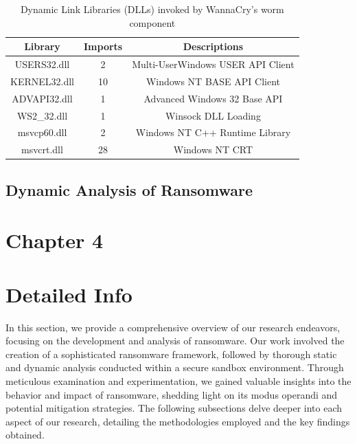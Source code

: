 \documentclass[12pt,letterpaper]{article}
\begin{document}
        \begin{table}[h]
            \centering
            \caption{Dynamic Link Libraries (DLLs) invoked by WannaCry's worm component}
            \label{tab:DLL-Link1 File}
            \begin{tabular}{ccc}
                \toprule
                \textbf{Library} & \textbf{Imports} & \textbf{Descriptions} \\
                \midrule
                USERS32.dll & 2& Multi-UserWindows USER API Client\\
                KERNEL32.dll & 10& Windows NT BASE API Client\\
                ADVAPI32.dll & 1& Advanced Windows 32 Base API\\
                WS2\_32.dll & 1& Winsock DLL Loading\\
                msvcp60.dll & 2 &  Windows NT C++ Runtime Library \\
                msvcrt.dll & 28 & Windows NT CRT \\
                \bottomrule
            \end{tabular}
        \end{table}


    \subsection{Dynamic Analysis of Ransomware}


    
            
\clearpage    
    \newpage
    \section*{Chapter 4}
        \section{Detailed Info}

            In this section, we provide a comprehensive overview of our research endeavors, focusing on the development and analysis of ransomware. Our work involved the creation of a sophisticated ransomware framework, followed by thorough static and dynamic analysis conducted within a secure sandbox environment. Through meticulous examination and experimentation, we gained valuable insights into the behavior and impact of ransomware, shedding light on its modus operandi and potential mitigation strategies. The following subsections delve deeper into each aspect of our research, detailing the methodologies employed and the key findings obtained.
            
\end{document}
